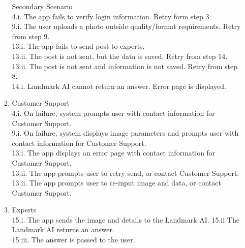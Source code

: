 \documentclass[]{article}
\begin{document}
\begin{enumerate}[{\bf BE1.}]
\begin{enumerate}[{\bf VP1.}]
                    Secondary Scenario \\
                    4.i. The app fails to verify login information. Retry form step 3. \\
                    9.i. The user uploads a photo outside quality/format requirements. Retry from step 9.\\ 
                    13.i. The app fails to send post to experts. \\
                    13.ii. The post is not sent, but the data is saved. Retry from step 14. \\
                    13.ii. The post is not sent and information is not saved. Retry from step 8. \\
                    14.i. Landmark AI cannot return an answer. Error page is displayed. \\
                    
			\item Customer Support \\
				4.i. On failure, system prompts user with contact information for Customer Support. \\
                9.i. On failure, system displays image parameters and prompts user with contact information for Customer Support. \\
                13.i. The app displays an error page with contact information for Customer Support. \\
	            13.ii. The app prompts user to retry send, or contact Customer Support. \\
	            13.ii. The app prompts user to re-input image and data, or contact Customer Support. \\

            \item Experts\\
                15.i. The app sends the image and details to the Landmark AI. 
                15.ii The Landmark AI returns an answer. \\
                15.iii. The answer is passed to the user.
            

\end{enumerate}
\end{enumerate}
\end{document}
